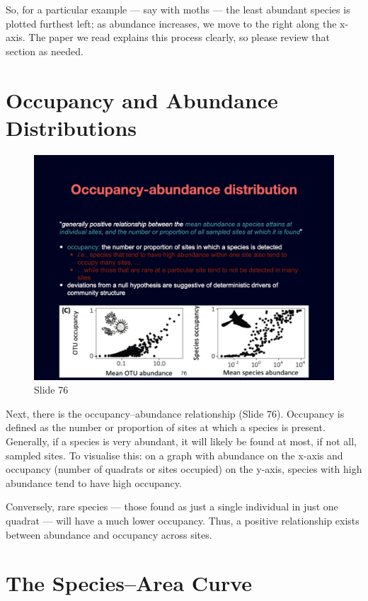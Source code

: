 \documentclass[
  11pt,
]{book}
\begin{document}
So, for a particular example --- say with moths --- the least abundant
species is plotted furthest left; as abundance increases, we move to the
right along the x-axis. The paper we read explains this process clearly,
so please review that section as needed.

\section{Occupancy and Abundance
Distributions}\label{occupancy-and-abundance-distributions}

\begin{figure}[ht]
\centering
\includegraphics[width=0.8\linewidth]{../images/BDC334/BDC334-076.jpeg}
\caption*{Slide 76}
\end{figure}

Next, there is the occupancy--abundance relationship (Slide 76).
Occupancy is defined as the number or proportion of sites at which a
species is present. Generally, if a species is very abundant, it will
likely be found at most, if not all, sampled sites. To visualise this:
on a graph with abundance on the x-axis and occupancy (number of
quadrats or sites occupied) on the y-axis, species with high abundance
tend to have high occupancy.

Conversely, rare species --- those found as just a single individual in
just one quadrat --- will have a much lower occupancy. Thus, a positive
relationship exists between abundance and occupancy across sites.

\section{The Species--Area Curve}\label{the-speciesarea-curve}
\end{document}
